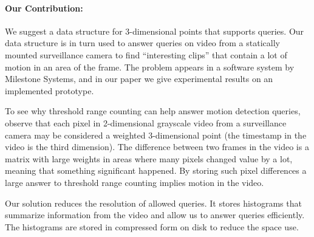 


\paragraph{Our Contribution: } 
We suggest a data structure for 3-dimensional points that supports  queries. Our data structure is in turn used to answer  queries on video from a statically mounted surveillance camera to find ``interesting clips'' that contain a lot of motion in an area of the frame. The problem appears in a software system by Milestone Systems, and in our paper we give experimental results on an implemented prototype.

To see why threshold range counting can help answer motion detection queries, observe that each pixel in 2-dimensional grayscale video from a surveillance camera may be considered a weighted 3-dimensional point (the timestamp in the video is the third dimension). The difference between two frames in the video is a matrix with large weights in areas where many pixels changed value by a lot, meaning that something significant happened. By storing such pixel differences a large answer to threshold range counting implies motion in the video.

Our solution reduces the resolution of allowed queries. It stores histograms that summarize information from the video and allow us to answer queries efficiently. The histograms are stored in compressed form on disk to reduce the space use. 

